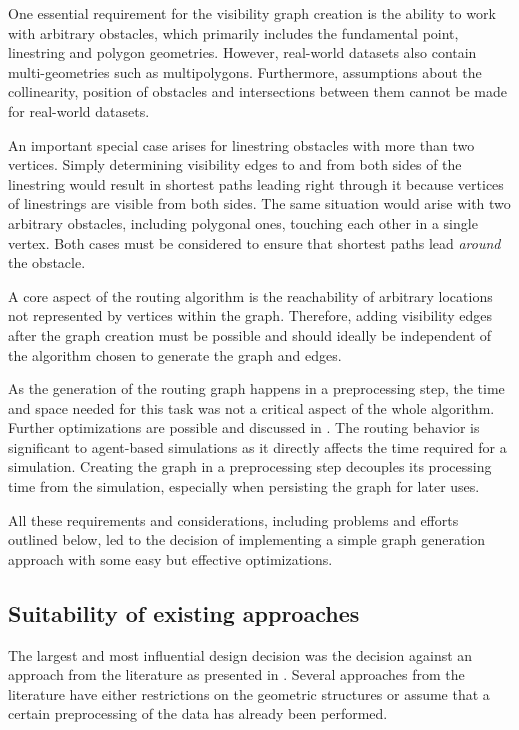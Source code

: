 		One essential requirement for the visibility graph creation is the ability to work with arbitrary obstacles, which primarily includes the fundamental point, linestring and polygon geometries.
		However, real-world datasets also contain multi-geometries such as multipolygons.
		Furthermore, assumptions about the collinearity, position of obstacles and intersections between them cannot be made for real-world datasets.
		
		An important special case arises for linestring obstacles with more than two vertices.
		Simply determining visibility edges to and from both sides of the linestring would result in shortest paths leading right through it because vertices of linestrings are visible from both sides.
		The same situation would arise with two arbitrary obstacles, including polygonal ones, touching each other in a single vertex.
		Both cases must be considered to ensure that shortest paths lead \emph{around} the obstacle.
		
		A core aspect of the routing algorithm is the reachability of arbitrary locations not represented by vertices within the graph.
		Therefore, adding visibility edges after the graph creation must be possible and should ideally be independent of the algorithm chosen to generate the graph and edges.
		
		As the generation of the routing graph happens in a preprocessing step, the time and space needed for this task was not a critical aspect of the whole algorithm.
		Further optimizations are possible and discussed in .
		The routing behavior is significant to agent-based simulations as it directly affects the time required for a simulation.
		Creating the graph in a preprocessing step decouples its processing time from the simulation, especially when persisting the graph for later uses.
		
		All these requirements and considerations, including problems and efforts outlined below, led to the decision of implementing a simple graph generation approach with some easy but effective optimizations.
	
	\subsection{Suitability of existing approaches}
	\label{subsec:suitablilty-edge-creation-approaches}

		The largest and most influential design decision was the decision against an approach from the literature as presented in .
		Several approaches from the literature have either restrictions on the geometric structures or assume that a certain preprocessing of the data has already been performed.
		
